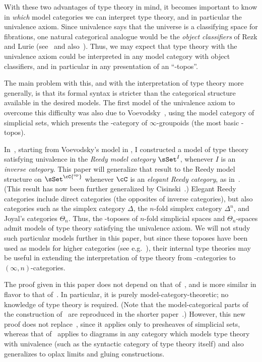 \documentclass{amsart}
\theoremstyle{remark}
{\newtheorem{{rmk}}[thm]{{Remark}}}
\numberwithin{equation}{section}
\theoremstyle{plain}
\begin{document}
With these two advantages of type theory in mind, it becomes important to know in \emph{which} model categories we can interpret type theory, and in particular the univalence axiom.
Since univalence says that the universe is a classifying space for fibrations, one natural categorical analogue would be the \emph{object classifiers} of Rezk and Lurie (see~\cite[\S6.1.6]{lurie:higher-topoi} and also~\cite{gk:univlcc}).
Thus, we may expect that type theory with the univalence axiom could be interpreted in any model category with object classifiers, and in particular in any presentation of an ``\io-topos''.

The main problem with this, and with the interpretation of type theory more generally, is that its formal syntax is stricter than the categorical structure available in the desired models.
The first model of the univalence axiom to overcome this difficulty was also due to Voevodsky~\cite{klv:ssetmodel}, using the model category \sSet of simplicial sets, which presents the \io-category of $\infty$-groupoids (the most basic \io-topos).

In~\cite{shulman:invdia}, starting from Voevodsky's model in \sSet, I constructed a model of type theory satisfying univalence in the \emph{Reedy model category} $\sSet^I$, whenever $I$ is an \emph{inverse category}.
This paper will generalize that result to the Reedy model structure on $\sSet^{\cC{^{\mathrm{op}}}}$ whenever $\cC$ is an \emph{elegant Reedy category}, as in~\cite{br:reedy}.
(This result has now been further generalized by Cisinski~\cite{cisinski:elegant}.)
Elegant Reedy categories include direct categories (the opposites of inverse categories), but also categories such as the simplex category $\Delta$, the $n$-fold simplex category $\Delta^n$, and Joyal's categories $\Theta_n$.
Thus, the \io-toposes of $n$-fold simplicial spaces and $\Theta_n$-spaces admit models of type theory satisfying the univalence axiom.
We will not study such particular models further in this paper, but since these toposes have been used as models for higher categories (see e.g.~\cite{rezk:css,rezk:cpncats}), their internal type theories may be useful in extending the interpretation of type theory from \io-categories to $(\infty,n)$-categories.

The proof given in this paper does not depend on that of~\cite{shulman:invdia}, and is more similar in flavor to that of~\cite{klv:ssetmodel}.
In particular, it is purely model-category-theoretic; no knowledge of type theory is required.
(Note that the model-categorical parts of the construction of~\cite{klv:ssetmodel} are reproduced in the shorter paper~\cite{klv:univalence}.)
However, this new proof does not replace~\cite{shulman:invdia}, since it applies only to presheaves of simplicial sets, whereas that of~\cite{shulman:invdia} applies to diagrams in any category which models type theory with univalence (such as the syntactic category of type theory itself) and also generalizes to oplax limits and gluing constructions.
\end{document}
